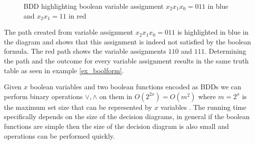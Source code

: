 \begin{example}
\begin{figure}[h]
	\caption{BDD highlighting boolean variable assignment $x_2x_1x_0 = 011$ in blue and $x_2x_1 = 11$ in red}
	\label{fig:ex_simplebdd}
\end{figure}
	
	The path created from variable assignment $x_2x_1x_0 = 011$ is highlighted in blue in the diagram and shows that this assignment is indeed not satisfied by the boolean formula. The red path shows the variable assignments $110$ and $111$. Determining the path and the outcome for every variable assignment results in the same truth table as seen in example \ref{ex_boolform}.
\end{example}

Given $x$ boolean variables and two boolean functions encoded as BDDs we can perform binary operations $\vee,\wedge$ on them in $O(2^{2x})=O(m^2)$ where $m = 2^x$ is the maximum set size that can be represented by $x$ variables \cite{BDD_running_time,Handbook_BDD_Chapter}. The running time specifically depends on the size of the decision diagrams, in general if the boolean functions are simple then the size of the decision diagram is also small and operations can be performed quickly.
